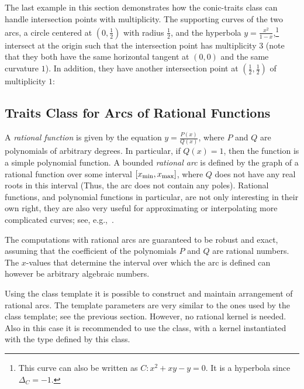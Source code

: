 
The last example in this section demonstrates how the conic-traits
class can handle intersection points with multiplicity. The
supporting curves of the two arcs, a circle centered at
$(0,\frac{1}{2})$ with radius $\frac{1}{2}$, and the hyperbola $y
= \frac{x^2}{1-x}$,\footnote{This curve can also be written as $C:
x^2 + xy - y = 0$. It is a hyperbola since $\Delta_{C} = -1$.}
intersect at the origin such that the intersection point has
multiplicity $3$ (note that they both have the same horizontal
tangent at $(0,0)$ and the same curvature $1$). In addition, they
have another intersection point at $(\frac{1}{2},\frac{1}{2})$ of
multiplicity $1$:


\subsection{Traits Class for Arcs of Rational Functions}
\label{arr_ssec:tr_ratfunc}
%
A {\em rational function} is given by the equation $y =
\frac{P(x)}{Q(x)}$, where $P$ and $Q$ are polynomials of arbitrary
degrees. In particular, if $Q(x) = 1$, then the function is a
simple polynomial function. A bounded {\em rational arc} is
defined by the graph of a rational function over some interval
$[x_{\rm min}, x_{\rm max}]$, where $Q$ does not have any real
roots in this interval (Thus, the arc does not contain any poles).
Rational functions, and polynomial functions in particular, are
not only interesting in their own right, they are also very useful
for approximating or interpolating more complicated curves; see,
e.g.,~\cite[Chapter~3]{cgal:ptvf-nrcpp-02}.

The computations with rational arcs are guaranteed to be robust and 
exact, assuming that the coefficient of the polynomials $P$ and $Q$
are rational  numbers. The $x$-values that determine the interval
over which the arc is defined can however be arbitrary algebraic
numbers.

Using the  class
template it is possible to construct and maintain arrangement of
rational arcs. The template parameters are very similar to the
ones used by the  class template; see
the previous section. However, no rational kernel is needed. Also
in this case it is recommended to use the
 class, with a kernel instantiated
with the  type defined by this class.

